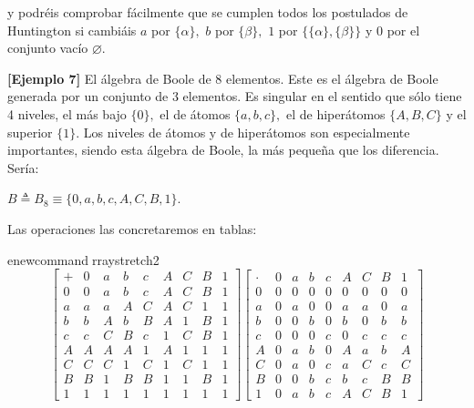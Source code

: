   y podréis comprobar fácilmente que se cumplen todos los postulados de
  Huntington si cambiáis $a$ por $\{\alpha\},$ $b$ por
  $\{\beta\},$ $1$ por $\{\{\alpha\},\{\beta\}\}$ y $0$
  por el conjunto vacío $\varnothing.$

  \textbf{{[}Ejemplo 7{]}} El álgebra de Boole de 8 elementos. Este es
  el álgebra de Boole generada por un conjunto de 3 elementos. Es
  singular en el sentido que sólo tiene 4 niveles, el más bajo
  $\{0\},$ el de átomos $\{a,b,c\},$ el de hiperátomos
  $\{A,B,C\}$ y el superior $\{1\}.$ Los niveles de átomos y de
  hiperátomos son especialmente importantes, siendo esta álgebra de
  Boole, la más pequeña que los diferencia. Sería:

  $B \triangleq B_{8} \equiv \{0,a,b,c,A,C,B,1\}.$

  Las operaciones las concretaremos en tablas:

  \setcounter{MaxMatrixCols}{20}
  \setlength{\arraycolsep}{8pt} %
  

enewcommand{rraystretch}{2}
  \[\begin{bmatrix}
   + & 0 & a & b & c & A & C & B & 1 \\
  0 & 0 & a & b & c & A & C & B & 1 \\
  a & a & a & A & C & A & C & 1 & 1 \\
  b & b & A & b & B & A & 1 & B & 1 \\
  c & c & C & B & c & 1 & C & B & 1 \\
  A & A & A & A & 1 & A & 1 & 1 & 1 \\
  C & C & C & 1 & C & 1 & C & 1 & 1 \\
  B & B & 1 & B & B & 1 & 1 & B & 1 \\
  1 & 1 & 1 & 1 & 1 & 1 & 1 & 1 & 1
  \end{bmatrix}\begin{bmatrix}
   \cdot & 0 & a & b & c & A & C & B & 1 \\
  0 & 0 & 0 & 0 & 0 & 0 & 0 & 0 & 0 \\
  a & 0 & a & 0 & 0 & a & a & 0 & a \\
  b & 0 & 0 & b & 0 & b & 0 & b & b \\
  c & 0 & 0 & 0 & c & 0 & c & c & c \\
  A & 0 & a & b & 0 & A & a & b & A \\
  C & 0 & a & 0 & c & a & C & c & C \\
  B & 0 & 0 & b & c & b & c & B & B \\
  1 & 0 & a & b & c & A & C & B & 1
  \end{bmatrix}\]

